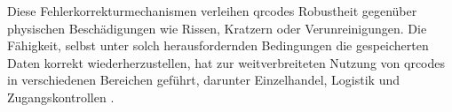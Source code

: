 Diese Fehlerkorrekturmechanismen verleihen \acrshort{qrcode}s Robustheit gegenüber physischen Beschädigungen wie Rissen, Kratzern oder Verunreinigungen. Die Fähigkeit, selbst unter solch herausfordernden Bedingungen die gespeicherten Daten korrekt wiederherzustellen, hat zur weitverbreiteten Nutzung von \acrshort{qrcode}s in verschiedenen Bereichen geführt, darunter Einzelhandel, Logistik und Zugangskontrollen \cite{QRCode2024}.